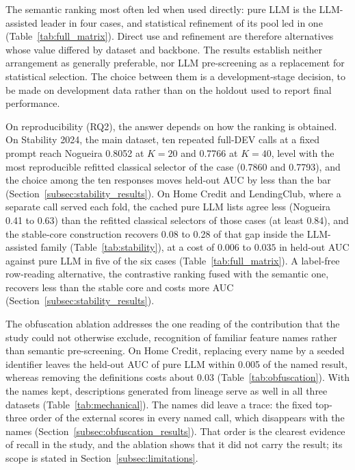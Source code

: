 \documentclass[final,5p,twocolumn]{elsarticle}
\newcommand{\Kfeat}{K}
\begin{document}
The semantic ranking most often led when used directly: pure LLM is the LLM-assisted leader in four cases, and statistical refinement of its pool led in one (Table~\ref{tab:full_matrix}). Direct use and refinement are therefore alternatives whose value differed by dataset and backbone. The results establish neither arrangement as generally preferable, nor LLM pre-screening as a replacement for statistical selection. The choice between them is a development-stage decision, to be made on development data rather than on the holdout used to report final performance.

On reproducibility (RQ2), the answer depends on how the ranking is obtained. On Stability 2024, the main dataset, ten repeated full-DEV calls at a fixed prompt reach Nogueira 0.8052 at $\Kfeat=20$ and 0.7766 at $\Kfeat=40$, level with the most reproducible refitted classical selector of the case (0.7860 and 0.7793), and the choice among the ten responses moves held-out AUC by less than the bar (Section~\ref{subsec:stability_results}). On Home Credit and LendingClub, where a separate call served each fold, the cached pure LLM lists agree less (Nogueira 0.41 to 0.63) than the refitted classical selectors of those cases (at least 0.84), and the stable-core construction recovers 0.08 to 0.28 of that gap inside the LLM-assisted family (Table~\ref{tab:stability}), at a cost of $0.006$ to $0.035$ in held-out AUC against pure LLM in five of the six cases (Table~\ref{tab:full_matrix}). A label-free row-reading alternative, the contrastive ranking fused with the semantic one, recovers less than the stable core and costs more AUC (Section~\ref{subsec:stability_results}).

The obfuscation ablation addresses the one reading of the contribution that the study could not otherwise exclude, recognition of familiar feature names rather than semantic pre-screening. On Home Credit, replacing every name by a seeded identifier leaves the held-out AUC of pure LLM within 0.005 of the named result, whereas removing the definitions costs about 0.03 (Table~\ref{tab:obfuscation}). With the names kept, descriptions generated from lineage serve as well in all three datasets (Table~\ref{tab:mechanical}). The names did leave a trace: the fixed top-three order of the external scores in every named call, which disappears with the names (Section~\ref{subsec:obfuscation_results}). That order is the clearest evidence of recall in the study, and the ablation shows that it did not carry the result; its scope is stated in Section~\ref{subsec:limitations}.
\end{document}
